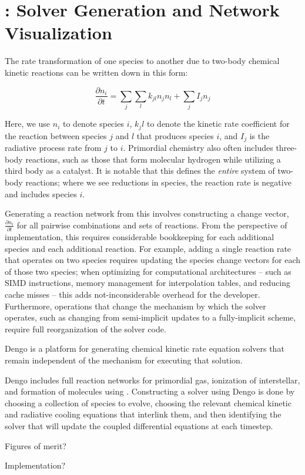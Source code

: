 \section{\dengo{}: Solver Generation and Network Visualization}


The rate transformation of one species to another due to two-body chemical kinetic
reactions can be written down in this form:

$$
\frac{\partial n_i }{\partial t} = \sum_{j}\sum_{l} k_{jl}n_{j}n_{l} + \sum_{j}I_{j}n_{j}
$$

Here, we use $n_{i}$ to denote species $i$, ${k_jl}$ to denote the kinetic rate
coefficient for the reaction between species $j$ and $l$ that produces species
$i$, and $I_{j}$ is the radiative process rate from $j$ to $i$.  Primordial
chemistry also often includes three-body reactions, such as those that
form molecular hydrogen while utilizing a third body as a catalyst.  It is
notable that this defines the \textit{entire} system of two-body reactions;
where we see reductions in species, the reaction rate is negative and includes
species ${i}$.


Generating a reaction network from this involves constructing a change vector,
$\frac{\partial n_i}{\partial t}$ for all pairwise combinations and sets of
reactions.  From the perspective of implementation, this requires considerable
bookkeeping for each additional species and each additional reaction.  For
example, adding a single reaction rate that operates on two species requires
updating the species change vectors for each of those two species; when
optimizing for computational architectures -- such as SIMD instructions, memory
management for interpolation tables, and reducing cache misses -- this adds
not-inconsiderable overhead for the developer.  Furthermore, operations that
change the mechanism by which the solver operates, such as changing from
semi-implicit updates to a fully-implicit scheme, require full reorganization
of the solver code.

Dengo is a platform for generating chemical kinetic rate equation solvers that
remain independent of the mechanism for executing that solution.


Dengo includes full reaction networks for primordial gas, ionization of
interstellar, and formation of molecules using .  Constructing a
solver using Dengo is done by choosing a collection of species to evolve,
choosing the relevant chemical kinetic and radiative cooling equations that
interlink them, and then identifying the solver that will update the coupled
differential equations at each timestep.



Figures of merit?

Implementation?
